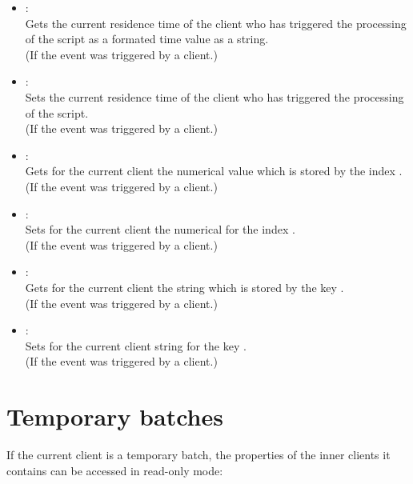 \begin{itemize}
\item
{}:\\
Gets the current residence time of the client who has triggered the processing of the script as a formated time value as a string.\\
(If the event was triggered by a client.)

\item
{}:\\
Sets the current residence time of the client who has triggered the processing of the script.\\
(If the event was triggered by a client.)

\item
{}:\\
Gets for the current client the numerical value which is stored by the index .\\
(If the event was triggered by a client.)
  
\item
{}:\\
Sets for the current client the numerical  for the index .\\
(If the event was triggered by a client.)

\item
{}:\\
Gets for the current client the string which is stored by the key .\\
(If the event was triggered by a client.)
  
\item
{}:\\
Sets for the current client string  for the key .\\
(If the event was triggered by a client.)

\end{itemize}

\section{Temporary batches}

If the current client is a temporary batch, the properties of the inner clients
it contains can be accessed in read-only mode:

